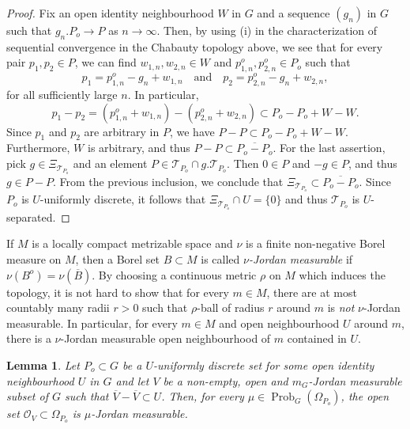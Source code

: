 \documentclass[12pt,reqno,a4paper]{amsart}
\numberwithin{equation}{section}
\newcommand{\cO}{\mathcal{O}}
\newcommand{\cT}{\mathcal{T}}
\newcommand{\ra}{\rightarrow}
\newcommand{\qand}{\quad \textrm{and} \quad}
\DeclareMathOperator{\Prob}{Prob}
\theoremstyle{theorem}
\newtheorem{lemma}[theorem]{Lemma}
\theoremstyle{task}
\theoremstyle{definition}
\begin{document}
\begin{proof}
Fix an open identity neighbourhood $W$ in $G$ and a sequence $(g_n)$ in $G$ such that $g_n.P_o \ra P$ as $n \ra \infty$. Then, by using (i) in the characterization of sequential convergence in the Chabauty topology above, we see that for every pair $p_1,p_2 \in P$,
we can find $w_{1,n}, w_{2,n} \in W$ and $p^{o}_{1,n}, p^{o}_{2,n} \in P_o$ such that
\[
p_1 = p^{o}_{1,n} - g_n + w_{1,n} \qand p_2 = p^{o}_{2,n} - g_n + w_{2,n}, 
\] 
for all sufficiently large $n$. In particular, 
\[
p_1 - p_2 = (p_{1,n}^o + w_{1,n}) - (p_{2,n}^o + w_{2,n}) \subset P_o - P_o  + W-W.
\] 
Since $p_1$ and $p_2$ are arbitrary in $P$, we have $P-P \subset P_o - P_o + W-W$. Furthermore, $W$ is arbitrary, and thus $P-P \subset \overline{P_o - P_o}$. For the last assertion, pick $g \in \Xi_{\cT_{P_o}}$ and an element $P \in \cT_{P_o} \cap g.\cT_{P_o}$. Then $0 \in P$ and $-g \in P$, and thus $g \in P-P$. From the previous inclusion, we conclude that $\Xi_{\cT_{P_o}} \subset \overline{P_o - P_o}$. Since $P_o$
is $U$-uniformly discrete, it follows that $\Xi_{\cT_{P_o}} \cap U = \{0\}$ and thus $\cT_{P_o}$ is $U$-separated.
\end{proof}

If $M$ is a locally compact metrizable space and $\nu$ is a finite non-negative 
Borel measure on $M$, then a Borel set $B \subset M$ is called \emph{$\nu$-Jordan measurable} if $\nu(B^o) = \nu(\overline{B})$. By choosing a continuous metric $\rho$
on $M$ which induces the topology, it is not hard to show that for every $m \in M$,
there are at most countably many radii $r > 0$ such that $\rho$-ball of radius $r$ around $m$ is \emph{not} $\nu$-Jordan measurable. In particular, for every $m \in M$
and open neighbourhood $U$ around $m$, there is a $\nu$-Jordan measurable open 
neighbourhood of $m$ contained in $U$. 

\begin{lemma}
\label{Lemma_Jordan}
Let $P_o \subset G$ be a $U$-uniformly discrete set for some open identity neighbourhood $U$ in $G$ and let $V$ be a non-empty, open and $m_G$-Jordan measurable subset of $G$ such that $\overline{V} - \overline{V} \subset U$. Then, for every $\mu \in \Prob_G(\Omega_{P_o})$, the open set $\cO_V \subset \Omega_{P_o}$ is $\mu$-Jordan measurable.
\end{lemma}
\end{document}
